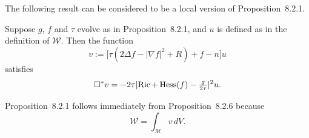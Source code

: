 The following result can be considered to be a local version of
Proposition~8.2.1.

\begin{proposition}
\label{topping-ch8-local-monotonicity}
Suppose $g$, $f$ and $\tau$ evolve as in Proposition~8.2.1, and $u$ is
defined as in the definition of $\mathcal W$. Then the function
\[
v := \bigl[\tau(2\Delta f - |\nabla f|^{2} + R) + f - n\bigr]u
\]
satisfies
\[
\Box^{*} v = -2\tau\lvert \operatorname{Ric} + \operatorname{Hess}(f) - \tfrac{g}{2\tau}\rvert^{2}u.
\]
\end{proposition}

\begin{remark}
\label{topping-ch8-proposition-implies-monotonicity}
Proposition~8.2.1 follows immediately from Proposition~8.2.6 because
\[
\mathcal W = \int_{\mathcal M} v\,dV.
\]
\end{remark}

